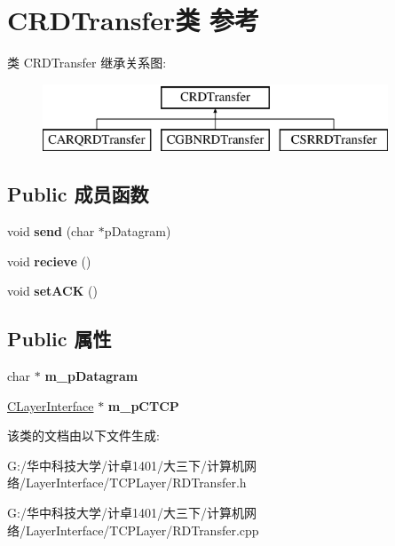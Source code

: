 \hypertarget{class_c_r_d_transfer}{}\section{C\+R\+D\+Transfer类 参考}
\label{class_c_r_d_transfer}
类 C\+R\+D\+Transfer 继承关系图\+:\begin{figure}[H]
\begin{center}
\leavevmode
\includegraphics[height=2.000000cm]{class_c_r_d_transfer}
\end{center}
\end{figure}
\subsection*{Public 成员函数}
\begin{DoxyCompactItemize}
\item 
\mbox{\label{class_c_r_d_transfer_ac98920ca7fa69b7d4ad47587a860e3f5}} 
void {\bfseries send} (char $\ast$p\+Datagram)
\item 
\mbox{\label{class_c_r_d_transfer_ae2d67458270389e3eef329bbdfac8a7a}} 
void {\bfseries recieve} ()
\item 
\mbox{\label{class_c_r_d_transfer_a35f5c58df35d4c513e5172d41e7707e0}} 
void {\bfseries set\+A\+CK} ()
\end{DoxyCompactItemize}
\subsection*{Public 属性}
\begin{DoxyCompactItemize}
\item 
\mbox{\label{class_c_r_d_transfer_a0ea73d394ba8b738de5d151b22425be6}} 
char $\ast$ {\bfseries m\+\_\+p\+Datagram}
\item 
\mbox{\label{class_c_r_d_transfer_a738fa552807680744a202da502ec61fa}} 
\hyperlink{class_c_layer_interface}{C\+Layer\+Interface} $\ast$ {\bfseries m\+\_\+p\+C\+T\+CP}
\end{DoxyCompactItemize}


该类的文档由以下文件生成\+:\begin{DoxyCompactItemize}
\item 
G\+:/华中科技大学/计卓1401/大三下/计算机网络/\+Layer\+Interface/\+T\+C\+P\+Layer/R\+D\+Transfer.\+h\item 
G\+:/华中科技大学/计卓1401/大三下/计算机网络/\+Layer\+Interface/\+T\+C\+P\+Layer/R\+D\+Transfer.\+cpp\end{DoxyCompactItemize}
